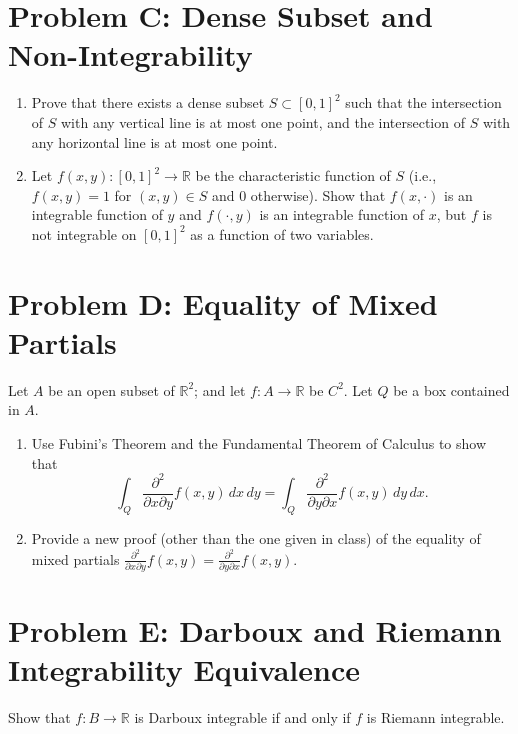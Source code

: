\documentclass[lang=cn,11pt]{template}
\begin{document}
\section*{Problem C: Dense Subset and Non-Integrability}
\begin{enumerate}
    \item Prove that there exists a dense subset \( S \subset [0, 1]^2 \) such that the intersection of \( S \) with any vertical line is at most one point, and the intersection of \( S \) with any horizontal line is at most one point.
    \item Let \( f(x, y) : [0, 1]^2 \rightarrow \mathbb{R} \) be the characteristic function of \( S \) (i.e., \( f(x, y) = 1 \) for \( (x, y) \in S \) and 0 otherwise). Show that \( f(x, \cdot) \) is an integrable function of \( y \) and \( f(\cdot, y) \) is an integrable function of \( x \), but \( f \) is not integrable on \( [0, 1]^2 \) as a function of two variables.
\end{enumerate}

\section*{Problem D: Equality of Mixed Partials}
Let \( A \) be an open subset of \( \mathbb{R}^2 \); and let \( f : A \rightarrow \mathbb{R} \) be \( C^2 \). Let \( Q \) be a box contained in \( A \).
\begin{enumerate}
    \item Use Fubini’s Theorem and the Fundamental Theorem of Calculus to show that
    \[
    \int_Q \frac{\partial^2}{\partial x \partial y} f(x, y) \, dx \, dy = \int_Q \frac{\partial^2}{\partial y \partial x} f(x, y) \, dy \, dx.
    \]
    \item Provide a new proof (other than the one given in class) of the equality of mixed partials \( \frac{\partial^2}{\partial x \partial y} f(x, y) = \frac{\partial^2}{\partial y \partial x} f(x, y) \).
\end{enumerate}

\section*{Problem E: Darboux and Riemann Integrability Equivalence}
Show that \( f : B \rightarrow \mathbb{R} \) is Darboux integrable if and only if \( f \) is Riemann integrable.
\end{document}
